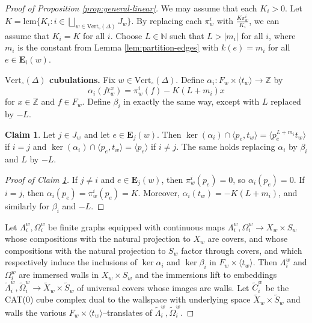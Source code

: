 \documentclass[11pt,oneside]{amsart}
\theoremstyle{definition}
\newtheorem{claim}{Claim}
\DeclareMathOperator{\kernel}{ker}
\newcommand{\field}[1]{\mathbb{#1}}
\newcommand{\integers}{\ensuremath{\field{Z}}}
\newcommand{\naturals}{\ensuremath{\field{N}}}
\newcommand{\lcm}{\ensuremath{\mathrm{l}\mathrm{c}\mathrm{m}}}
\newcommand{\vertices}{\mathrm{Vert}}
\begin{document}
\begin{proof}[Proof of Proposition \ref{prop:general-linear}]
 We may assume that each $K_i>0$.  Let $K=\lcm\{K_i:i\in\bigsqcup_{w\in\vertices_\circ(\Delta)}J_w\}$.  By replacing each $\pi^i_w$ with $\frac{K\pi^i_w}{K_i}$, we can assume that $K_i=K$ for all $i$.  Choose $L\in\naturals$ such that $L>|m_i|$ for all $i$, where $m_i$ is the constant from Lemma \ref{lem:partition-edges} with $k(e)=m_i$ for all $e\in\mathbf E_i(w)$.

 \textbf{$\vertices_\circ(\Delta)$ cubulations.}  Fix $w\in\vertices_\circ(\Delta)$.  Define $\alpha_i:F_w\times \langle t_w\rangle\to\integers$ by
 $$\alpha_i(ft_w^x)=\pi^i_w(f)-K(L+m_i)x$$
 for $x\in\integers$ and $f\in F_w$.  Define $\beta_i$ in exactly the same way, except with $L$ replaced by $-L$.

 \begin{claim}\label{claim:kernel-alpha-linear}
 Let $j\in J_w$ and let $e\in \mathbf E_j(w)$.  Then $\kernel(\alpha_i)\cap \langle p_e,t_w\rangle =\langle p_e^{L+m_i}t_w\rangle$ if $i=j$ and $\kernel(\alpha_i)\cap \langle p_e,t_w\rangle=\langle p_e\rangle$ if $i\neq j$.  The same holds replacing $\alpha_i$ by $\beta_i$ and $L$ by $-L$.
 \end{claim}
\renewcommand{\qedsymbol}{$\blacksquare$}
 \begin{proof}[Proof of Claim \ref{claim:kernel-alpha-linear}]
 If $j\neq i$ and $e\in\mathbf E_j(w)$, then $\pi^i_w(p_e)=0$, so $\alpha_i(p_e)=0$.  If $i=j$, then $\alpha_i(p_e)=\pi^i_w(p_e)=K$.  Moreover, $\alpha_i(t_w)=-K(L+m_i)$, and similarly for $\beta_i$ and $-L$.
 \end{proof}

Let $\Lambda^w_i,\Omega^w_i$ be finite graphs equipped with continuous maps $\Lambda^w_i,\Omega^w_i\to X_w\times S_w$ whose compositions with the natural projection to $X_w$ are covers, and whose compositions with the natural projection to $S_w$ factor through covers, and which respectively induce the inclusions of $\kernel\alpha_i$ and $\kernel\beta_i$ in $F_w\times\langle t_w\rangle$.  Then $\Lambda^w_i$ and $\Omega^w_i$ are immersed walls in $X_w\times S_w$ and the immersions lift to embeddings $\widetilde \Lambda^w_i,\widetilde \Omega^w_i\to\widetilde X_w\times \widetilde S_w$ of universal covers whose images are walls.  Let $\widetilde C^w_i$ be the CAT(0) cube complex dual to the wallspace with underlying space $\widetilde X_w\times \widetilde S_w$ and walls the various $F_w\times \langle t_w\rangle$--translates of $\widetilde \Lambda^w_i,\widetilde \Omega^w_i$.


\end{proof}
\end{document}
